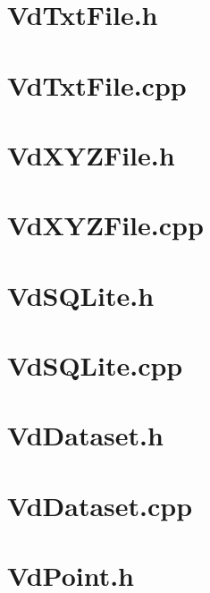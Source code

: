 \documentclass[a4paper,12pt,bibliography=totoc, listof=totoc,titlepage,pointlessnumbers]{scrreprt}
\begin{document}
\begin{appendices}
\section{VdTxtFile.h}
\label{a:VdTxtFile.h}


\section{VdTxtFile.cpp}
\label{a:VdTxtFile.cpp}


\section{VdXYZFile.h}
\label{a:VdXYZFile.h}


\section{VdXYZFile.cpp}
\label{a:VdXYZFile.cpp}


\section{VdSQLite.h}
\label{a:VdSQLite.h}


\section{VdSQLite.cpp}
\label{a:VdSQLite.cpp}


\section{VdDataset.h}
\label{a:VdDataset.h}


\section{VdDataset.cpp}
\label{a:VdDataset.cpp}


\section{VdPoint.h}
\label{a:VdPoint.h}



\end{appendices}
\end{document}
